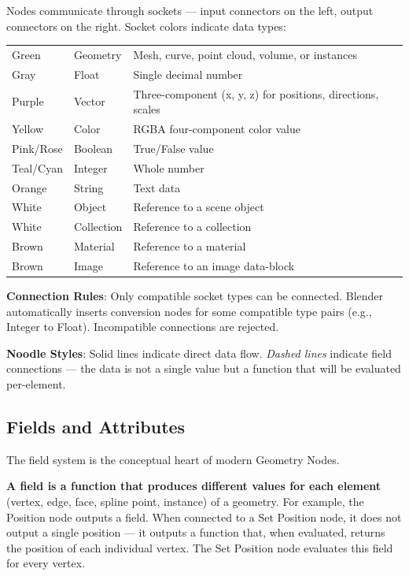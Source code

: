 Nodes communicate through sockets --- input connectors on the left, output connectors on the right. Socket colors indicate data types:

\begin{center}
\begin{tabularx}{\textwidth}{L{3cm}L{2.5cm}X}
\toprule
{}
 &  &  \\
\midrule
Green & Geometry & Mesh, curve, point cloud, volume, or instances \\
Gray & Float & Single decimal number \\
Purple & Vector & Three-component (x, y, z) for positions, directions, scales \\
Yellow & Color & RGBA four-component color value \\
Pink/Rose & Boolean & True/False value \\
Teal/Cyan & Integer & Whole number \\
Orange & String & Text data \\
White & Object & Reference to a scene object \\
White & Collection & Reference to a collection \\
Brown & Material & Reference to a material \\
Brown & Image & Reference to an image data-block \\
\bottomrule
\end{tabularx}
\end{center}

\textbf{Connection Rules}: Only compatible socket types can be connected. Blender automatically inserts conversion nodes for some compatible type pairs (e.g., Integer to Float). Incompatible connections are rejected.

\textbf{Noodle Styles}: Solid lines indicate direct data flow. \textit{Dashed lines} indicate field connections --- the data is not a single value but a function that will be evaluated per-element.

\subsection{Fields and Attributes}
\label{sec:gnfields}

The field system is the conceptual heart of modern Geometry Nodes.

\textbf{A field is a function that produces different values for each element} (vertex, edge, face, spline point, instance) of a geometry. For example, the Position node outputs a field. When connected to a Set Position node, it does not output a single position --- it outputs a function that, when evaluated, returns the position of each individual vertex. The Set Position node evaluates this field for every vertex.

